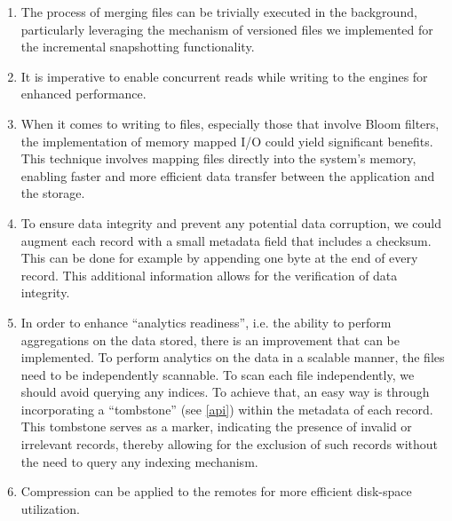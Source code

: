 \begin{enumerate}
    \item The process of merging files can be trivially executed in the background, particularly leveraging the mechanism of versioned files we implemented for the incremental snapshotting functionality.

    \item It is imperative to enable concurrent reads while writing to the engines for enhanced performance.

    \item When it comes to writing to files, especially those that involve Bloom filters, the implementation of memory mapped I/O could yield significant benefits. This technique involves mapping files directly into the system's memory, enabling faster and more efficient data transfer between the application and the storage.

    \item To ensure data integrity and prevent any potential data corruption, we could augment each record with a small metadata field that includes a checksum. This can be done for example by appending one byte at the end of every record. This additional information allows for the verification of data integrity.

    \item In order to enhance ``analytics readiness'', i.e. the ability to perform aggregations on the data stored, there is an improvement that can be implemented. To perform analytics on the data in a scalable manner, the files need to be independently scannable. To scan each file independently, we should avoid querying any indices. To achieve that, an easy way is through incorporating a ``tombstone'' (see \ref{api}) within the metadata of each record. This tombstone serves as a marker, indicating the presence of invalid or irrelevant records, thereby allowing for the exclusion of such records without the need to query any indexing mechanism.

    \item Compression can be applied to the remotes for more efficient disk-space utilization.
\end{enumerate}
